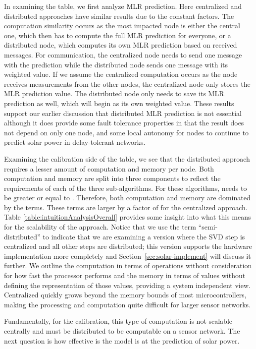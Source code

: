 \documentclass[prodmode,acmtosn]{acmsmall}
\begin{document}
In examining the table, we first analyze MLR prediction.
Here centralized and distributed approaches have similar results due to the constant factors.
The computation similarity occurs as the most impacted node is either the central one, which then has to compute the full MLR prediction for everyone, or a distributed node, which computes its own MLR prediction based on received messages.
For communication, the centralized node needs to send one message with the prediction while the distributed node sends one message with its weighted value.
If we assume the centralized computation occurs as the node receives measurements from the other nodes, the centralized node only stores the MLR prediction value.
The distributed node only needs to save its MLR prediction as well, which will begin as its own weighted value.
These results support our earlier discussion that distributed MLR prediction is not essential although it does provide some fault tolerance properties in that the result does not depend on only one node, and some local autonomy for nodes to continue to predict solar power in delay-tolerant networks.

Examining the calibration side of the table, we see that the distributed approach requires a lesser amount of computation and memory per node.
Both computation and memory are split into three components to reflect the requirements of each of the three sub-algorithms.
For these algorithms,  needs to be greater or equal to .
Therefore, both computation and memory are dominated by the  terms.
These terms are larger by a factor of  for the centralized approach.
Table \ref{table:intuitionAnalysisOverall} provides some insight into what this means for the scalability of the approach.
Notice that we use the term ``semi-distributed'' to indicate that we are examining a version where the SVD step is centralized and all other steps are distributed; this version supports the hardware implementation more completely and Section~\ref{sec:solar-implement} will discuss it further.
We outline the computation in terms of operations without consideration for how fast the processor performs and the memory in terms of values without defining the representation of those values, providing a system independent view.
Centralized quickly grows beyond the memory bounds of most microcontrollers, making the processing and computation quite difficult for larger sensor networks.

Fundamentally, for the calibration, this type of computation is not scalable centrally and must be distributed to be computable on a sensor network.
The next question is how effective is the model is at the prediction of solar power.
\end{document}
